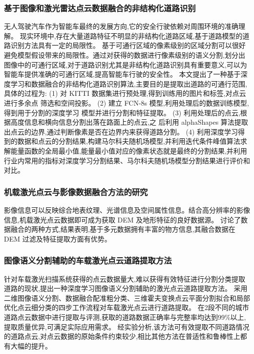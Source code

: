 \message{ !name(\unexpanded{数据融合}.tex)}\documentclass{amsart}
\begin{document}
\subsubsection{基于图像和激光雷达点云数据融合的非结构化道路识别}
无人驾驶汽车作为智能车最终的发展方向,它的安全行驶依赖对周围环境的准确理解。
现实环境中,存在大量道路特征不明显的非结构化道路区域,基于道路模型的道路识别方法具有一定的局限性。
基于可通行区域的像素级别的区域分割可以很好避免模型假设带来的局限性。通过对获得的数据进行像素级别的语义分割,划分出图像中的可通行区域,对于道路识别尤其是非结构化道路识别具有重要意义,可以为智能车提供准确的可通行区域,提高智能车行驶的安全性。
本文提出了一种基于深度学习和数据融合的非结构化道路识别算法,主要目的是提取出道路的可通行范围,具体的过程为:
(1) 对 KITTI 数据集进行预处理,得到训练用的图片和标签,对点云进行多余点
筛选和空间投影。
(2) 建立 FCN-8s 模型,利用处理后的数据训练模型,得到用于分割的深度学习
模型并进行分割和特征提取。
(3) 利用处理后的点云,根据高度信息和横向信息分割出落在路面上的点云,之
后利用 alphaShapes 算法提取出点云的边界,通过判断像素是否在边界内来获得道路分割。
(4) 利用深度学习得到的数据和点云的分割结果,构建马尔科夫随机场模型,并利用迭代条件峰值算法求解能量函数的全局最小值,能量最小值对应的像素状态就是最终的分割结果,并利用行业内常用的指标对深度学习分割结果、马尔科夫随机场模型分割结果进行评价和对比。

\subsubsection{机载激光点云与影像数据融合方法的研究}

\cite{隆华平}影像信息可以反映综合地表纹理、光谱信息及空间属性信息。结合高分辨率的影像信息,机载激光点云数据即可成为获取 DEM 及地形特征的良好数据源。
讨论了数据融合的两种方式,结果表明,基于多元数据拥有丰富的物方信息,其融合数据在 DEM 过滤及特征提取方面有优势。

\subsubsection{图像语义分割辅助的车载激光点云道路提取方法}
\cite{于博}针对车载激光扫描系统获得的点云数据量大,难以获得有效特征进行分割分类提取道路的现状,提出一种深度学习图像语义分割辅助的激光点云道路提取方法。
采用二维图像语义分割、数据融合配准粗分类、三维霍夫变换点云平面分割拟合和局部优化点云细分类的四步工作流程对车载激光点云进行道路提取。
在2段不同的城市道路点云数据中进行提取与评测,获取的道路数据正确率与完整率均达到99\%以上,提取质量优异,可满足实际应用需求。
经实验分析,该方法可有效提取不同道路情况的道路点云,对点云数据的原始条件约束较少,相比其他方法在普适性和鲁棒性上都有大幅的提升。
\end{document}
